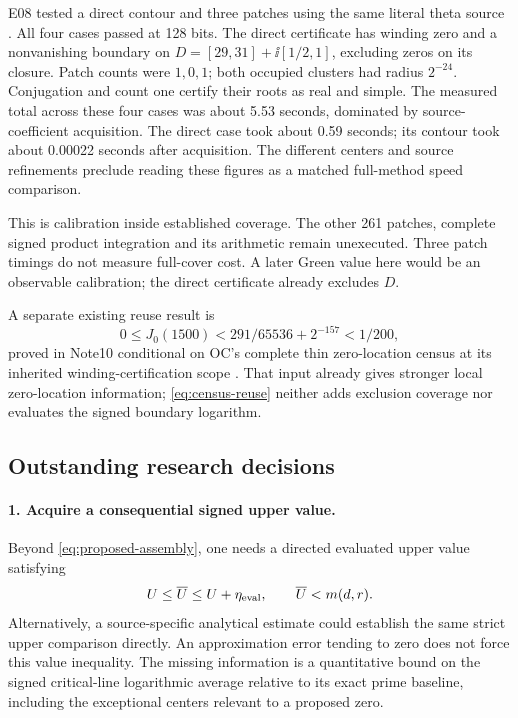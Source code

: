 E08 tested a direct contour and three patches using the same literal
theta source \cite{OGPilot,OGPilotAssessment}. All four cases passed
at 128 bits. The direct certificate has winding zero and a nonvanishing
boundary on \(D=[29,31]+\ii[1/2,1]\), excluding zeros on its closure.
Patch counts were \(1,0,1\); both occupied clusters had radius
\(2^{-24}\). Conjugation and count one certify their roots as real
and simple. The measured total across these four cases was about
5.53 seconds, dominated by source-coefficient acquisition.
The direct case took about 0.59 seconds; its contour took about
0.00022 seconds after acquisition. The different centers and source
refinements preclude reading these figures as a matched full-method
speed comparison.

This is calibration inside established coverage. The other 261
patches, complete signed product integration and its arithmetic
remain unexecuted. Three patch timings do not measure full-cover
cost. A later Green value here would be an observable calibration;
the direct certificate already excludes \(D\).

A separate existing reuse result is
\begin{equation}\label{eq:census-reuse}
 0\le J_0(1500)<291/65536+2^{-157}<1/200,
\end{equation}
proved in Note10 conditional on OC's complete thin zero-location
census at its inherited winding-certification scope
\cite{OGSiblingReuse}. That input already gives stronger local
zero-location information; \eqref{eq:census-reuse} neither adds
exclusion coverage nor evaluates the signed boundary logarithm.

\subsection{Outstanding research decisions}

\paragraph{1. Acquire a consequential signed upper value.}
Beyond \eqref{eq:proposed-assembly}, one needs a directed evaluated
upper value satisfying
\[
 U\le\overline U\le U+\eta_{\rm eval},\qquad
 \overline U<m(d,r).
\]
Alternatively, a source-specific analytical estimate could establish
the same strict upper comparison directly.
An approximation error tending to zero does not force this value
inequality. The missing information is a quantitative bound on the
signed critical-line logarithmic average relative to its exact prime
baseline, including the exceptional centers relevant to a proposed zero.

